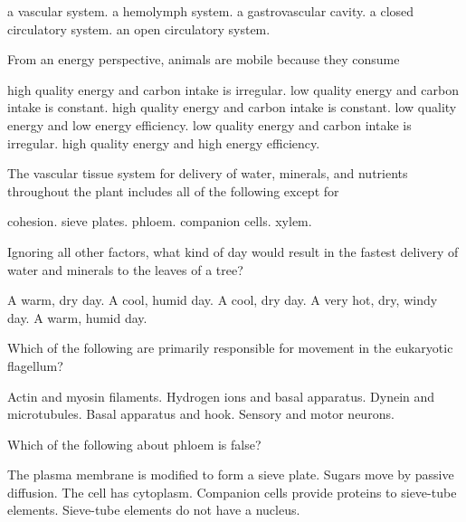 \begin{choices}
\choice a vascular system. 
\choice a hemolymph system. 
\choice a gastrovascular cavity. 
\correctchoice a closed circulatory system. 
\choice an open circulatory system. 
\end{choices}

\question
From an energy perspective, animals are mobile because they consume

\begin{choices}
\choice high quality energy and carbon intake is irregular. 
\choice low quality energy and carbon intake is constant. 
\choice high quality energy and carbon intake is constant. 
\choice low quality energy and low energy efficiency.
\correctchoice low quality energy and carbon intake is irregular.
\choice high quality energy and high energy efficiency. 
\end{choices}

\question
The vascular tissue system for delivery of water, minerals, and nutrients throughout the plant includes all of the following except for

\begin{choices}
\correctchoice cohesion. 
\choice sieve plates. 
\choice phloem. 
\choice companion cells. 
\choice xylem. 
\end{choices}

\question
Ignoring all other factors, what kind of day would result in the fastest delivery of water and minerals to the leaves of a tree?

\begin{choices}
\correctchoice A warm, dry day. 
\choice A cool, humid day. 
\choice A cool, dry day. 
\choice A very hot, dry, windy day. 
\choice A warm, humid day.  
\end{choices}

\newpage

\question
Which of the following are primarily responsible for movement in the eukaryotic flagellum?

\begin{choices}
\choice Actin and myosin filaments.  
\choice Hydrogen ions and basal apparatus. 
\correctchoice Dynein and microtubules. 
\choice Basal apparatus and hook. 
\choice Sensory and motor neurons. 
\end{choices}

\question
Which of the following about phloem is false?

\begin{choices}
\correctchoice The plasma membrane is modified to form a sieve plate. 
\choice Sugars move by passive diffusion. 
\choice The cell has cytoplasm. 
\choice Companion cells provide proteins to sieve-tube elements. 
\choice Sieve-tube elements do not have a nucleus. 
\end{choices}

